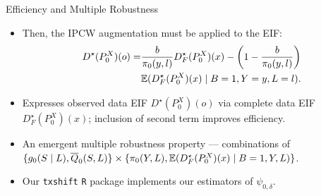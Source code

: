 \documentclass{beamer}
\begin{document}
\begin{frame}[c]{Efficiency and Multiple Robustness~\citep{hejazi2020efficient}}

\begin{center}
\begin{itemize}
  \itemsep8pt
  \item Then, the IPCW augmentation must be applied to the EIF\footnotemark:
    \begin{align*}
      D^{\star}(P_0^X)(o) = &\frac{b}{\pi_0(y, l)} D^{\star}_F(P_0^X)(x) -
        \left(1 - \frac{b}{\pi_0(y, l)}\right) \\
        &\mathbb{E}(D^{\star}_F(P_0^X)(x) \mid B = 1, Y = y, L = l).
    \end{align*}
  \item Expresses observed data EIF $D^{\star}(P_0^X)(o)$ via complete data
     EIF $D^{\star}_F(P_0^X)(x)$; inclusion of second term improves efficiency.
 \item An emergent multiple robustness property --- combinations of
    $\{g_0(S \mid L), \overline{Q}_0(S,L)\} \times \{\pi_0(Y, L),
    \mathbb{E}(D^{\star}_F(P^X_0)(x) \mid B = 1, Y, L)\}$.
  \item Our \texttt{txshift} \texttt{R} package implements our estimators of
    $\psi_{0,\delta}$.
\end{itemize}
\end{center}



\end{frame}






\end{document}
